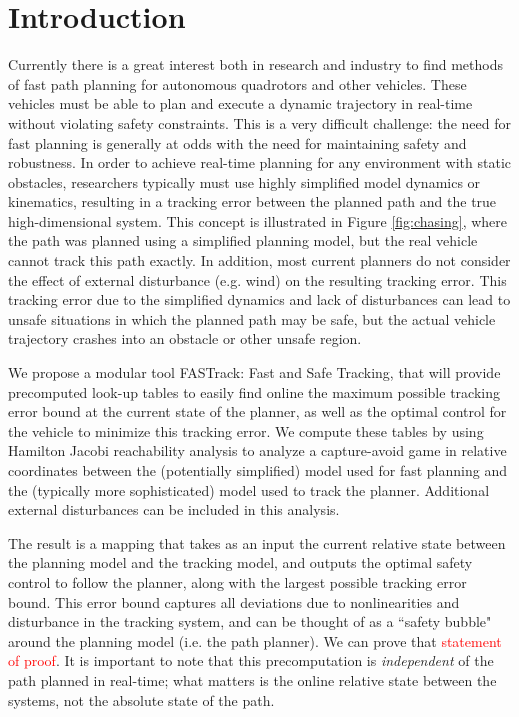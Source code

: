\section{Introduction}
 Currently there is a great interest both in research and industry to find methods of fast path planning for autonomous quadrotors and other vehicles. These vehicles must be able to plan and execute a dynamic trajectory in real-time without violating safety constraints. This is a very difficult challenge: the need for fast planning is generally at odds with the need for maintaining safety and robustness. In order to achieve real-time planning for any environment with static obstacles, researchers typically must use highly simplified model dynamics or kinematics, resulting in a tracking error between the planned path and the true high-dimensional system. This concept is illustrated in Figure \ref{fig:chasing}, where the path was planned using a simplified planning model, but the real vehicle cannot track this path exactly. In addition, most current planners do not consider the effect of external disturbance (e.g. wind) on the resulting tracking error. This tracking error due to the simplified dynamics and lack of disturbances can lead to unsafe situations in which the planned path may be safe, but the actual vehicle trajectory crashes into an obstacle or other unsafe region.

We propose a modular tool FASTrack: Fast and Safe Tracking, that will provide precomputed look-up tables to easily find online the maximum possible tracking error bound at the current state of the planner, as well as the optimal control for the vehicle to minimize this tracking error. We compute these tables by using Hamilton Jacobi reachability analysis to analyze a capture-avoid game in relative coordinates between the (potentially simplified) model used for fast planning and the (typically more sophisticated) model used to track the planner. Additional external disturbances can be included in this analysis. 

The result is a mapping that takes as an input the current relative state between the planning model and the tracking model, and outputs the optimal safety control to follow the planner, along with the largest possible tracking error bound. This error bound captures all deviations due to nonlinearities and disturbance in the tracking system, and can be thought of as a ``safety bubble" around the planning model (i.e. the path planner). We can prove that \textcolor{red}{statement of proof}. It is important to note that this precomputation is \textit{independent} of the path planned in real-time; what matters is the online relative state between the systems, not the absolute state of the path. 

